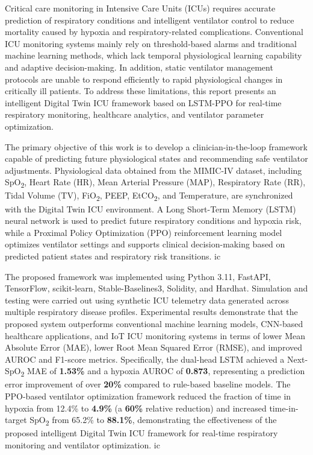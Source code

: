 \documentclass[12pt,a4paper,oneside]{report}
\begin{document}
Critical care monitoring in Intensive Care Units (ICUs) requires accurate prediction of respiratory conditions and intelligent ventilator control to reduce mortality caused by hypoxia and respiratory-related complications. Conventional ICU monitoring systems mainly rely on threshold-based alarms and traditional machine learning methods, which lack temporal physiological learning capability and adaptive decision-making. In addition, static ventilator management protocols are unable to respond efficiently to rapid physiological changes in critically ill patients. To address these limitations, this report presents an intelligent Digital Twin ICU framework based on LSTM-PPO for real-time respiratory monitoring, healthcare analytics, and ventilator parameter optimization.

The primary objective of this work is to develop a clinician-in-the-loop framework capable of predicting future physiological states and recommending safe ventilator adjustments. Physiological data obtained from the MIMIC-IV dataset, including SpO\textsubscript{2}, Heart Rate (HR), Mean Arterial Pressure (MAP), Respiratory Rate (RR), Tidal Volume (TV), FiO\textsubscript{2}, PEEP, EtCO\textsubscript{2}, and Temperature, are synchronized with the Digital Twin ICU environment. A Long Short-Term Memory (LSTM) neural network is used to predict future respiratory conditions and hypoxia risk, while a Proximal Policy Optimization (PPO) reinforcement learning model optimizes ventilator settings and supports clinical decision-making based on predicted patient states and respiratory risk transitions. \gls{ic}

The proposed framework was implemented using Python 3.11, FastAPI, TensorFlow, scikit-learn, Stable-Baselines3, Solidity, and Hardhat. Simulation and testing were carried out using synthetic ICU telemetry data generated across multiple respiratory disease profiles. Experimental results demonstrate that the proposed system outperforms conventional machine learning models, CNN-based healthcare applications, and IoT ICU monitoring systems in terms of lower Mean Absolute Error (MAE), lower Root Mean Squared Error (RMSE), and improved AUROC and F1-score metrics. Specifically, the dual-head LSTM achieved a Next-SpO\textsubscript{2} MAE of \textbf{1.53\%} and a hypoxia AUROC of \textbf{0.873}, representing a prediction error improvement of over \textbf{20\%} compared to rule-based baseline models. The PPO-based ventilator optimization framework reduced the fraction of time in hypoxia from 12.4\% to \textbf{4.9\%} (a \textbf{60\%} relative reduction) and increased time-in-target SpO\textsubscript{2} from 65.2\% to \textbf{88.1\%}, demonstrating the effectiveness of the proposed intelligent Digital Twin ICU framework for real-time respiratory monitoring and ventilator optimization. \gls{ic}
\end{document}
